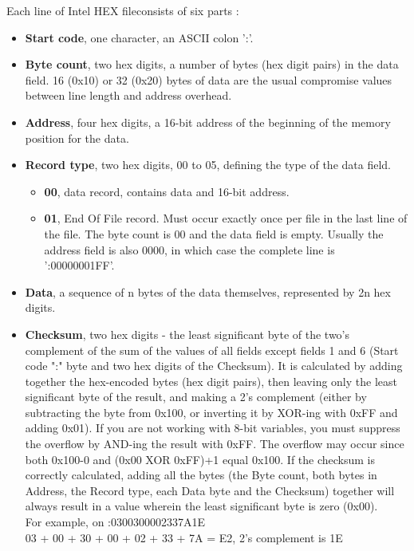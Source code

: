 Each line of Intel HEX fileconsists of six parts  :
\begin{itemize}
\item \textbf{Start code}, one character, an ASCII colon ':'.
\item \textbf{Byte count}, two hex digits, a number of bytes (hex digit pairs) in the data field. 16 (0x10) or 32 (0x20) bytes of data are the usual compromise values between line length and address overhead.
\item \textbf{Address}, four hex digits, a 16-bit address of the beginning of the memory position for the data.
\item \textbf{Record type}, two hex digits, 00 to 05, defining the type of the data field.
	\begin{itemize}
	\item \textbf{00}, data record, contains data and 16-bit address.
	\item \textbf{01}, End Of File record. Must occur exactly once per file in the last line of the file. The byte count is 00 and the data field is empty. Usually the address field is also 0000, in which case the complete line is ':00000001FF'.
	\end{itemize}
\item \textbf{Data}, a sequence of n bytes of the data themselves, represented by 2n hex digits.
\item \textbf{Checksum}, two hex digits - the least significant byte of the two's complement of the sum of the values of all fields except fields 1 and 6 (Start code ":" byte and two hex digits of the Checksum). It is calculated by adding together the hex-encoded bytes (hex digit pairs), then leaving only the least significant byte of the result, and making a 2's complement (either by subtracting the byte from 0x100, or inverting it by XOR-ing with 0xFF and adding 0x01). If you are not working with 8-bit variables, you must suppress the overflow by AND-ing the result with 0xFF. The overflow may occur since both 0x100-0 and (0x00 XOR 0xFF)+1 equal 0x100. If the checksum is correctly calculated, adding all the bytes (the Byte count, both bytes in Address, the Record type, each Data byte and the Checksum) together will always result in a value wherein the least significant byte is zero (0x00).
\\For example, on :0300300002337A1E\\
03 + 00 + 30 + 00 + 02 + 33 + 7A = E2, 2's complement is 1E
\end{itemize}

